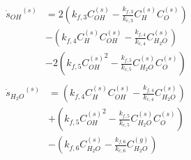 \documentclass[a4paper]{report}
\newcommand{\sks}[1]{{\dot{s}_{#1}}^{(s)}}
\newcommand{\kf}[1]{k_{f,#1}}
\newcommand{\kcf}[1]{\frac{k_{f,#1}}{k_{c,#1}}}
\newcommand{\cg}[1]{C_{#1}^{(g)}}
\newcommand{\cs}[1]{C_{#1}^{(s)}}
\begin{document}
\begin{enumerate}
\begin{align}
    \begin{split}
      \sks{OH} &= 2 \left( \kf{3} \cs{OH} - \kcf{3} \cs{H} \cs{O} \right) \\
      &-\left( \kf{4} \cs{H} \cs{OH} - \kcf{4} \cs{H_2O} \right) \\
      &-2\left( \kf{5} {\cs{OH}}^2 - \kcf{5} \cs{H_2O} \cs{O} \right)
    \end{split} \\
    \begin{split}
      \sks{H_2O} &= \left( \kf{4} \cs{H} \cs{OH} - \kcf{4} \cs{H_2O} \right) \\
      &+\left( \kf{5} {\cs{OH}}^2 - \kcf{5} \cs{H_2O} \cs{O} \right) \\
      &-\left( \kf{6} \cs{H_2O} - \kcf{6} \cg{H_2O} \right)
    \end{split}
    \label{source terms}
  \end{align}
  
\end{enumerate}
\end{document}

